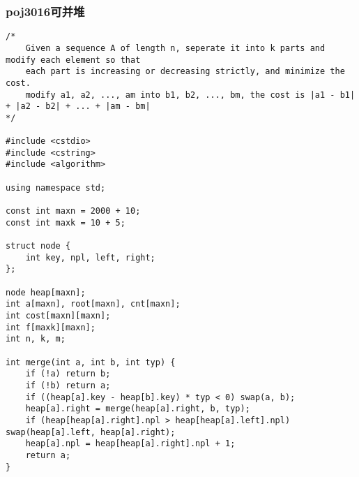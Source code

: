 \subsubsection{poj3016可并堆}
\begin{verbatim}
/*
    Given a sequence A of length n, seperate it into k parts and modify each element so that
    each part is increasing or decreasing strictly, and minimize the cost.
    modify a1, a2, ..., am into b1, b2, ..., bm, the cost is |a1 - b1| + |a2 - b2| + ... + |am - bm|
*/

#include <cstdio>
#include <cstring>
#include <algorithm>

using namespace std;

const int maxn = 2000 + 10;
const int maxk = 10 + 5;

struct node {
    int key, npl, left, right;
};

node heap[maxn];
int a[maxn], root[maxn], cnt[maxn];
int cost[maxn][maxn];
int f[maxk][maxn];
int n, k, m;

int merge(int a, int b, int typ) {
    if (!a) return b;
    if (!b) return a;
    if ((heap[a].key - heap[b].key) * typ < 0) swap(a, b);
    heap[a].right = merge(heap[a].right, b, typ);
    if (heap[heap[a].right].npl > heap[heap[a].left].npl) swap(heap[a].left, heap[a].right);
    heap[a].npl = heap[heap[a].right].npl + 1;
    return a;
}


\end{verbatim}
